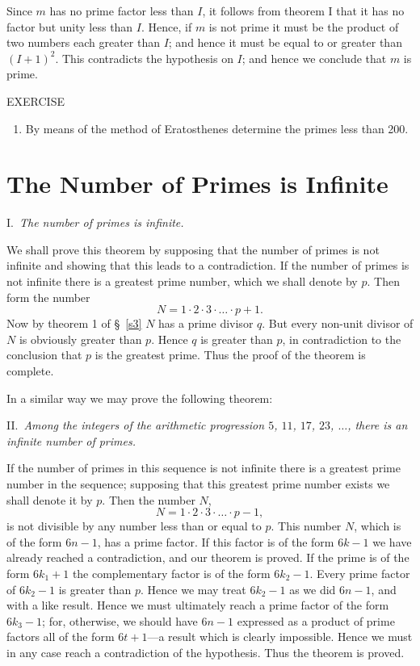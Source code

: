 \documentclass[oneside]{book}
\begin{document}
Since $m$ has no prime factor less than $I$, it follows from theorem
I that it has no factor but unity less than $I$. Hence, if $m$ is
not prime it must be the product of two numbers each greater than
$I$; and hence it must be equal to or greater than $(I+1)^2$. This
contradicts the hypothesis on $I$; and hence we conclude that $m$ is
prime.

\begin{center}
EXERCISE
\end{center}

\small \begin{enumerate}
\item[ ] By means of the method of Eratosthenes determine the primes
less than 200.
\end{enumerate}
\normalsize

\section{The Number of Primes is Infinite}\label{s4}%

I.~\emph{The number of primes is infinite.}

We shall prove this theorem by supposing that the number of primes
is not infinite and showing that this leads to a contradiction. If
the number of primes is not infinite there is a greatest prime
number, which we shall denote by $p$. Then form the number
\begin{equation*}
N = 1 \cdot 2 \cdot 3 \cdot \ldots \cdot p + 1.
\end{equation*}
Now by theorem 1 of \S~\ref{s3} $N$ has a prime divisor $q$. But
every non-unit divisor of $N$ is obviously greater than $p$. Hence
$q$ is greater than $p$, in contradiction to the conclusion that $p$
is the greatest prime. Thus the proof of the theorem is complete.

In a similar way we may prove the following theorem:

\smallskip II.~\emph{Among the integers of the arithmetic
progression $5$, $11$, $17$, $23$, $\ldots$, there is an infinite
number of primes.}

If the number of primes in this sequence is not infinite there is a
greatest prime number in the sequence; supposing that this greatest
prime number exists we shall denote it by $p$. Then the number $N$,
\begin{equation*}
N = 1 \cdot 2 \cdot 3 \cdot \ldots \cdot p-1,
\end{equation*}
is not divisible by any number less than or equal to $p$. This
number $N$, which is of the form $6n - 1$, has a prime factor. If
this factor is of the form $6k - 1$ we have already reached a
contradiction, and our theorem is proved. If the prime is of the
form $6k_1 + 1$ the complementary factor is of the form $6k_2 - 1$.
Every prime factor of $6k_2 - 1$ is greater than $p$. Hence we may
treat $6k_2 - 1$ as we did $6n - 1$, and with a like result. Hence
we must ultimately reach a prime factor of the form $6k_3 - 1$; for,
otherwise, we should have $6n - 1$ expressed as a product of prime
factors all of the form $6t + 1$---a result which is clearly
impossible. Hence we must in any case reach a contradiction of the
hypothesis. Thus the theorem is proved.
\end{document}
